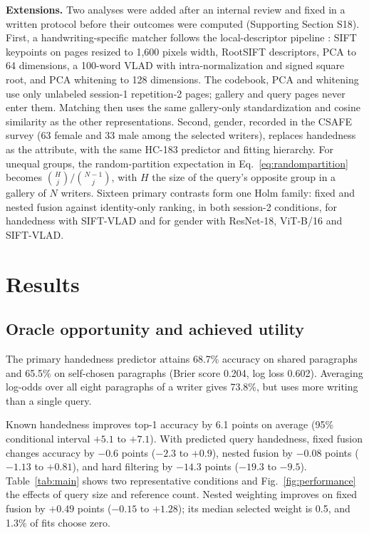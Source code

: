 \textbf{Extensions.} Two analyses were added after an internal review and fixed in a written protocol before their outcomes were computed (Supporting Section S18). First, a handwriting-specific matcher follows the local-descriptor pipeline \cite{lowe2004sift,arandjelovic2012rootsift,jegou2010vlad,christlein2017gmm}: SIFT keypoints on pages resized to 1,600 pixels width, RootSIFT descriptors, PCA to 64 dimensions, a 100-word VLAD with intra-normalization and signed square root, and PCA whitening to 128 dimensions. The codebook, PCA and whitening use only unlabeled session-1 repetition-2 pages; gallery and query pages never enter them. Matching then uses the same gallery-only standardization and cosine similarity as the other representations. Second, gender, recorded in the CSAFE survey (63 female and 33 male among the selected writers), replaces handedness as the attribute, with the same HC-183 predictor and fitting hierarchy. For unequal groups, the random-partition expectation in Eq.~\eqref{eq:randompartition} becomes $\binom{H}{j}/\binom{N-1}{j}$, with $H$ the size of the query's opposite group in a gallery of $N$ writers. Sixteen primary contrasts form one Holm family: fixed and nested fusion against identity-only ranking, in both session-2 conditions, for handedness with SIFT-VLAD and for gender with ResNet-18, ViT-B/16 and SIFT-VLAD.

\section{Results}
\label{sec:results}
\subsection{Oracle opportunity and achieved utility}
The primary handedness predictor attains 68.7\% accuracy on shared paragraphs and 65.5\% on self-chosen paragraphs (Brier score 0.204, log loss 0.602). Averaging log-odds over all eight paragraphs of a writer gives 73.8\%, but uses more writing than a single query.

Known handedness improves top-1 accuracy by 6.1 points on average (95\% conditional interval $+5.1$ to $+7.1$). With predicted query handedness, fixed fusion changes accuracy by $-0.6$ points ($-2.3$ to $+0.9$), nested fusion by $-0.08$ points ($-1.13$ to $+0.81$), and hard filtering by $-14.3$ points ($-19.3$ to $-9.5$). Table~\ref{tab:main} shows two representative conditions and Fig.~\ref{fig:performance} the effects of query size and reference count. Nested weighting improves on fixed fusion by $+0.49$ points ($-0.15$ to $+1.28$); its median selected weight is 0.5, and 1.3\% of fits choose zero.

